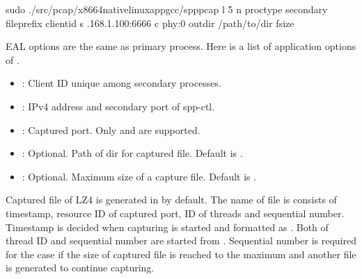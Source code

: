 \documentclass[a4paper,11pt,openany,oneside,english]{sphinxmanual}
\begin{document}
\begin{sphinxVerbatim}[commandchars=\\\{\},formatcom=\footnotesize]
 sudo ./src/pcap/x86\PYGZus{}64\PYGZhy{}native\PYGZhy{}linuxapp\PYGZhy{}gcc/spp\PYGZus{}pcap 
    \PYGZhy{}l \PYGZhy{}5 \PYGZhy{}n  
    \PYGZhy{}\PYGZhy{}proc\PYGZhy{}type secondary 
    \PYGZhy{}\PYGZhy{}file\PYGZhy{}prefix  
    \PYGZhy{}\PYGZhy{} 
    \PYGZhy{}\PYGZhy{}client\PYGZhy{}id  
    \PYGZhy{}s .168.1.100:6666 
    \PYGZhy{}c phy:0 
    \PYGZhy{}\PYGZhy{}out\PYGZhy{}dir /path/to/dir 
    \PYGZhy{}\PYGZhy{}fsize 
\end{sphinxVerbatim}

EAL options are the same as primary process. Here is a list of application
options of .
\begin{itemize}
\item {} 
: Client ID unique among secondary processes.

\item {} 
: IPv4 address and secondary port of spp-ctl.

\item {} 
: Captured port. Only  and  are supported.

\item {} 
: Optional. Path of dir for captured file. Default is .

\item {} 
: Optional. Maximum size of a capture file. Default is .

\end{itemize}

Captured file of LZ4 is generated in  by default.
The name of file is consists of timestamp, resource ID of captured port,
ID of  threads and sequential number.
Timestamp is decided when capturing is started and formatted as
.
Both of  thread ID and sequential number are started from .
Sequential number is required for the case if the size of
captured file is reached to the maximum and another file is generated to
continue capturing.
\end{document}
